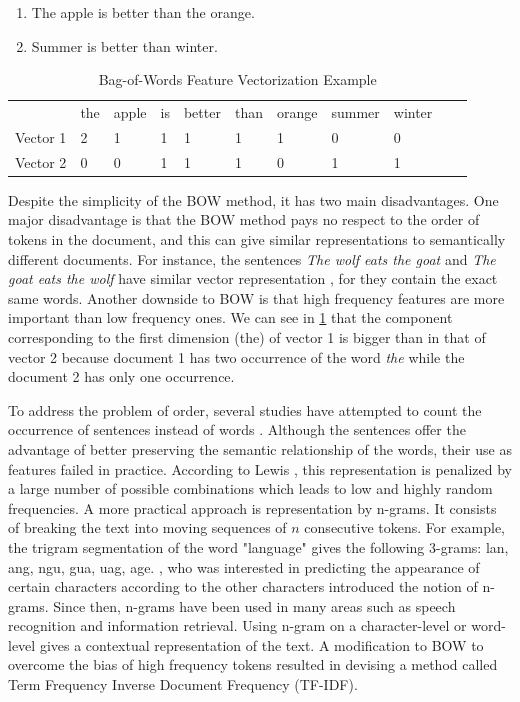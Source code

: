 \begin{enumerate}
\item The apple is better than the orange.
\item Summer is better than winter. 
\end{enumerate}




\begin{table}
\centering
\caption {Bag-of-Words Feature Vectorization Example}
\begin{tabular}{l|l|l|l|l|l|l|l|l|l|l}
 & the & apple & is & better & than & orange & summer & winter \\
Vector 1 & 2 & 1 & 1 & 1 & 1 & 1 & 0 & 0 \\
Vector 2 & 0 & 0 & 1 & 1 & 1 & 0 & 1 & 1 \\
\end{tabular}
\label {tb:bow}
\end{table}


Despite the simplicity of the BOW method,  it has two main disadvantages. One major disadvantage is that the BOW method pays no respect to the order of tokens in the document, and this can give similar representations to semantically different documents. For instance, the sentences \emph{The wolf eats the goat} and \emph{The goat eats the wolf} have similar vector representation , for they contain the exact same words. Another downside to BOW is that high frequency features are more important than low frequency ones. We can see in \ref{tb:bow} that the component corresponding to the first dimension (the) of vector 1 is bigger than in that of vector 2 because document 1 has two occurrence of the word \emph{the} while the document 2 has only one occurrence. 

To address the problem of order, several studies have attempted to count the occurrence of sentences instead of words \citep{fuhr1991probabilistic, tzeras1993automatic}. Although the sentences offer the advantage of better preserving the semantic relationship of the words, their use as features failed in practice. According to Lewis \citeyear{lewis1992representation}, this representation is penalized by a large number of possible combinations which leads to low and highly
random frequencies. A more practical approach is representation by n-grams. It consists of breaking the text into moving sequences of $n$ consecutive tokens. For example, the trigram segmentation of the word "language" gives the following 3-grams: lan, ang, ngu, gua, uag, age. \citep{shannon1948mathematical}, who was interested in predicting the appearance of certain characters according to the other characters introduced the notion of n-grams. Since then, n-grams have been used in many areas such as speech recognition and information retrieval. Using n-gram on a character-level or word-level gives a contextual representation of the text. A modification to BOW to overcome the bias of high frequency tokens resulted in devising a method called Term Frequency Inverse Document Frequency (TF-IDF). 

